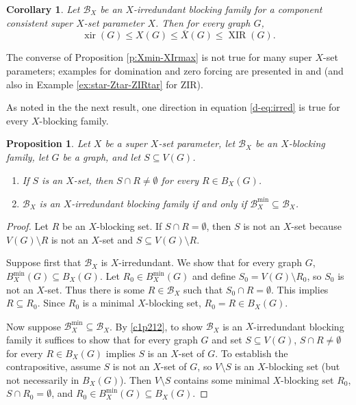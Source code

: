 \documentclass{article}
\numberwithin{figure}{section}
\numberwithin{table}{section}
\numberwithin{equation}{section}
\newtheorem{cor}[thm]{Corollary}
\newtheorem{prop}[thm]{Proposition}
\theoremstyle{definition}
\theoremstyle{definition}
\theoremstyle{definition}
\newcommand{\B}{\mathcal{B}}
\newcommand{\ben}{\begin{enumerate}}
\newcommand{\een}{\end{enumerate}}
\newcommand{\bpf}{\begin{proof}}
\newcommand{\epf}{\end{proof}\ms}
\newcommand{\ms}{\medskip}
\newcommand{\ol}{\overline}
\newcommand{\xbar}{\ol X}
\DeclareMathOperator{\xir}{xir}
\DeclareMathOperator{\XIR}{XIR}
\begin{document}
\begin{cor}\label{c:param-interlace}
    Let  $ \B_X$ be an $X$-irredundant blocking family for a component consistent super $X$-set parameter $X$.  Then for every graph $G$,
    \[ \xir(G)\le X(G)\le \xbar(G)\le \XIR(G).\]
\end{cor}

The converse of Proposition \ref{p:Xmin-XIrmax} is not true for many super $X$-set parameters; examples for domination and zero forcing are presented in  \cite{MR21} and \cite{ZIR} (and also in Example \ref{ex:star-Ztar-ZIRtar} for ZIR).

As noted in the the next result, one direction in equation \eqref{d-eq:irred} is true for every $X$-blocking family.

\begin{prop}\label{p:xirred-min}
    Let $X$  be a super $X$-set parameter, let $\B_X$ be an $X$-blocking family, let $G$ be a graph, and let $S\subseteq V(G)$.  

    \ben[$(1)$]
    \item\label{c1p212}   If $S$ is an $X$-set, then $S\cap R\ne \emptyset$ for every $R\in B_X(G)$.
    \item $\B_X$ is an $X$-irredundant blocking family if and only if $\B^{\min}_X\subseteq \B_X$.
    \een
\end{prop}
\bpf 
Let $R$ be an $X$-blocking set.
If $S\cap R=\emptyset$, then $S$ is not an $X$-set because $V(G)\setminus R$ is not an $X$-set and $S\subseteq V(G)\setminus R$. 

 Suppose first that $\B_X$ is $X$-irredundant.  We show that for every graph $G$, $B^{\min}_X(G)\subseteq B_X(G)$.
Let $R_0\in B^{\min}_X(G)$ 
and define $S_0=V(G)\setminus R_0$, so $S_0$ is not an $X$-set. Thus there is some $R\in \B_X$ such that  $S_0\cap R=\emptyset$.  This implies $R\subseteq R_0$.  Since $R_0$ is a minimal $X$-blocking set, $R_0=R\in B_X(G)$. 

Now suppose $\B^{\min}_X\subseteq \B_X$.  By \eqref{c1p212}, to show $\B_X$ is an $X$-irredundant blocking family it suffices to show that for every graph $G$ and set $S\subseteq V(G)$, $S\cap R\ne \emptyset$ for every  $R\in B_X(G)$ implies $S$ is an $X$-set of $G$. To establish the contrapositive, assume $S$ is not an $X$-set of $G$, so $V\setminus S$ is an $X$-blocking set (but not necessarily in $B_X(G)$). Then $V\setminus S$ contains some minimal $X$-blocking set $R_0$,  $S\cap R_0= \emptyset$, and $R_0\in B^{\min}_X(G)\subseteq B_X(G)$.
\epf
\end{document}
